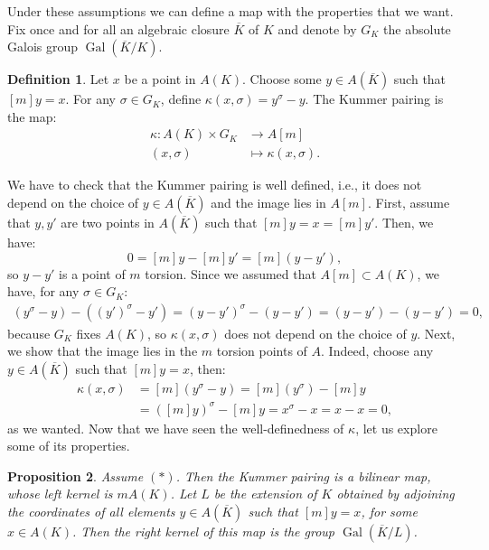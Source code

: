 \documentclass[a4paper, 12pt]{amsart}
\theoremstyle{definition}
\newtheorem{defn0}{Definition}[section]
\theoremstyle{plain}
\newtheorem{prop0}[defn0]{Proposition}
\theoremstyle{plain}
\theoremstyle{plain}
\theoremstyle{plain}
\theoremstyle{remark}
\theoremstyle{remark}
\theoremstyle{plain}
\newenvironment{definition}{ \begin{defn0}}{\end{defn0}}
\newenvironment{proposition}{ \begin{prop0}}{\end{prop0}}
\DeclareMathOperator{\Gal}{Gal}
\begin{document}
	Under these assumptions we can define a map with the properties that we want. Fix once and for all an algebraic closure $\overline{K}$ of $K$ and denote by $G_K$ the absolute Galois group $\Gal(\overline{K}/K)$.
	\begin{definition}
		Let $x$ be a point in $A(K)$. Choose some $y\in A(\overline{K})$ such that $[m]y=x$. For any $\sigma\in G_K$, define $\kappa(x,\sigma)=y^\sigma-y$. The Kummer pairing is the map:
		\begin{align*}
			\kappa:A(K)\times G_K&\rightarrow A[m]\\
			(x,\sigma)&\mapsto \kappa(x,\sigma).
		\end{align*}
	\end{definition}
	We have to check that the Kummer pairing is well defined, i.e., it does not depend on the choice of $y\in A(\overline{K})$ and the image lies in $A[m]$. First, assume that $y,y'$ are two points in $A(\overline{K})$ such that $[m]y=x=[m]y'$. Then, we have:
	\begin{equation*}
		0=[m]y-[m]y'=[m](y-y'),
	\end{equation*}
	so $y-y'$ is a point of $m$ torsion. Since we assumed that $A[m]\subset A(K)$, we have, for any $\sigma\in G_K$:
	\begin{align*}
		(y^\sigma-y)-((y')^\sigma-y')=(y-y')^\sigma - (y-y')=(y-y')-(y-y')=0,
	\end{align*}
	because $G_K$ fixes $A(K)$, so $\kappa(x,\sigma)$ does not depend on the choice of $y$. Next, we show that the image lies in the $m$ torsion points of $A$. Indeed, choose any $y\in A(\overline{K})$ such that $[m]y=x$, then:
	\begin{align*}
		[m]\kappa(x,\sigma)&=[m](y^\sigma-y)=[m](y^\sigma)-[m]y\\
		&=([m]y)^\sigma-[m]y=x^\sigma-x=x-x=0,
	\end{align*}
	as we wanted. Now that we have seen the well-definedness of $\kappa$, let us explore some of its properties.
	\begin{proposition}\label{kummerproperties}
		Assume $(*)$. Then the Kummer pairing is a bilinear map, whose left kernel is $mA(K)$. Let $L$ be the extension of $K$ obtained by adjoining the coordinates of all elements $y\in A(\overline{K})$ such that $[m]y=x$, for some $x\in A(K)$. Then the right kernel of this map is the group $\Gal(\overline{K}/L)$.
	\end{proposition}
\end{document}
